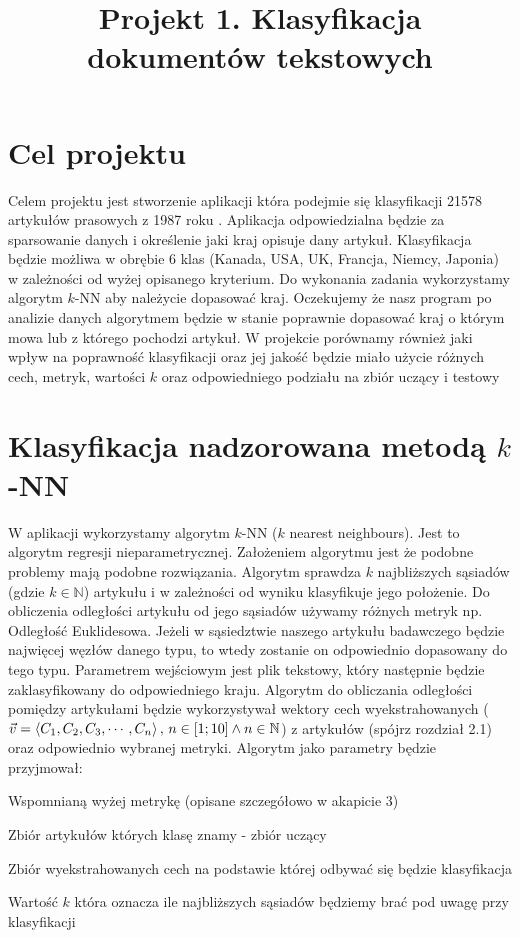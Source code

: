 \documentclass{classrep}
\author{
  \studentinfo{Przemysław Lis}{229940} \and
  \studentinfo{Michał Olczak}{229972} }
\title{Projekt 1. Klasyfikacja dokumentów tekstowych}
\begin{document}
\maketitle


\section{Cel projektu}
Celem projektu jest stworzenie aplikacji która podejmie się klasyfikacji 21578 artykułów prasowych z 1987 roku \cite{reuters21578}. Aplikacja odpowiedzialna będzie za sparsowanie danych i określenie jaki kraj opisuje dany artykuł. Klasyfikacja będzie możliwa w obrębie 6 klas (Kanada, USA, UK, Francja, Niemcy, Japonia) w zależności od wyżej opisanego kryterium. Do wykonania zadania wykorzystamy algorytm $k$-NN aby należycie dopasować
kraj. Oczekujemy że nasz program po analizie danych algorytmem będzie w stanie poprawnie
dopasować kraj o którym mowa lub z którego pochodzi artykuł. W projekcie porównamy również jaki wpływ na poprawność klasyfikacji oraz jej jakość będzie miało użycie różnych cech, metryk, wartości $k$ oraz odpowiedniego podziału na zbiór uczący i testowy\\
\noindent


\section{Klasyfikacja nadzorowana metodą $k$-NN}
W aplikacji wykorzystamy algorytm $k$-NN ($k$ nearest neighbours)\cite{knn1}\cite{knn2}. Jest to algorytm  regresji nieparametrycznej. Założeniem algorytmu jest że podobne problemy mają podobne rozwiązania. Algorytm sprawdza $k$ najbliższych sąsiadów (gdzie $k \in \mathbb{N}$) artykułu i w zależności od wyniku klasyfikuje jego położenie. Do obliczenia odległości artykułu od jego sąsiadów używamy różnych metryk np. Odległość Euklidesowa. Jeżeli w sąsiedztwie naszego artykułu badawczego będzie najwięcej węzłów danego typu, to wtedy zostanie on odpowiednio dopasowany do tego typu.
Parametrem wejściowym jest plik tekstowy, który następnie będzie zaklasyfikowany do odpowiedniego kraju.
Algorytm do obliczania odległości pomiędzy artykułami będzie wykorzystywał wektory cech wyekstrahowanych ($\vec{v} = \left\langle C_1, C_2, C_3, \cdots, C_n\right\rangle,\\ \, n \in [1; 10] \wedge n \in \mathbb{N}$) z artykułów (spójrz rozdział 2.1) oraz odpowiednio wybranej metryki. Algorytm jako parametry będzie przyjmował:
\vspace{5px}
\begin{enumerate*}
\setlength\itemsep{5px}
\item Wspomnianą wyżej metrykę (opisane szczegółowo w akapicie 3)
\item Zbiór artykułów których klasę znamy - zbiór uczący
\item Zbiór wyekstrahowanych cech na podstawie której odbywać się będzie klasyfikacja
\item Wartość $k$ która oznacza ile najbliższych sąsiadów będziemy brać pod uwagę przy klasyfikacji
\end{enumerate*}
\noindent
\end{document}
